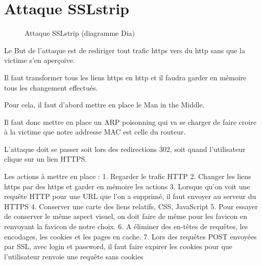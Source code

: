 \chapter{Attaque SSLstrip}

\begin{figure}[H]
  \caption{Attaque SSLstrip (diagramme Dia)}
\end{figure}

Le But de l'attaque est de rediriger tout trafic https vers du http sans que la victime s'en aperçoive.

Il faut transformer tous les liens https en http et il faudra garder en mémoire tous les changement effectués.

Pour cela, il faut d'abord mettre en place le Man in the Middle.

Il faut donc mettre en place un ARP poisonning qui va se charger de faire croire à la victime que notre addresse MAC est celle du routeur.

L'attaque doit se passer soit lors des redirections 302, soit quand l'utilisateur clique sur un lien HTTPS.

Les actions à mettre en place :
1. Regarder le trafic HTTP
2. Changer les liens https par des https et garder en mémoire les actions
3. Lorsque qu'on voit une requête HTTP pour une URL que l'on a supprimé, il faut envoyer au serveur du HTTPS
4. Conserver une carte des liens relatifs, CSS, JavaScript
5. Pour essayer de conserver le même aspect visuel, on doit faire de même pour les favicon en renvoyant la favicon de notre choix.
6. A éliminer des en-têtes de requêtes, les encodages, les cookies et les pages en cache.
7. Lors des requêtes POST envoyées par SSL, avec login et password, il faut faire expirer les cookies pour que l'utilisateur renvoie une requête sans cookies
